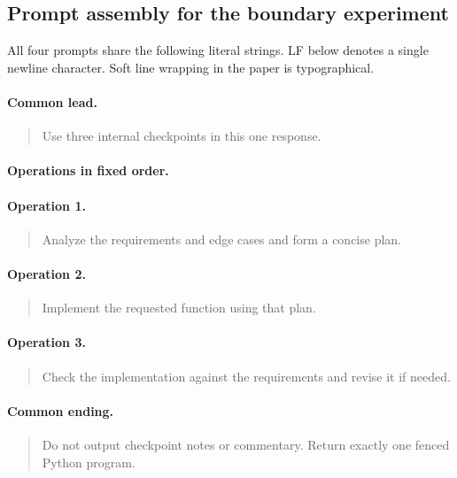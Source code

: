 \clearpage\subsection{Prompt assembly for the boundary experiment}
All four prompts share the following literal strings. LF below denotes a single newline character. Soft line wrapping in the paper is typographical.
\paragraph{Common lead.}\begin{quote}\small
Use three internal checkpoints in this one response.
\end{quote}

\paragraph{Operations in fixed order.}
\paragraph*{Operation 1.}\begin{quote}\small
Analyze the requirements and edge cases and form a concise plan.
\end{quote}

\paragraph*{Operation 2.}\begin{quote}\small
Implement the requested function using that plan.
\end{quote}

\paragraph*{Operation 3.}\begin{quote}\small
Check the implementation against the requirements and revise it if needed.
\end{quote}

\paragraph{Common ending.}\begin{quote}\small
Do not output checkpoint notes or commentary. Return exactly one fenced Python program.
\end{quote}


